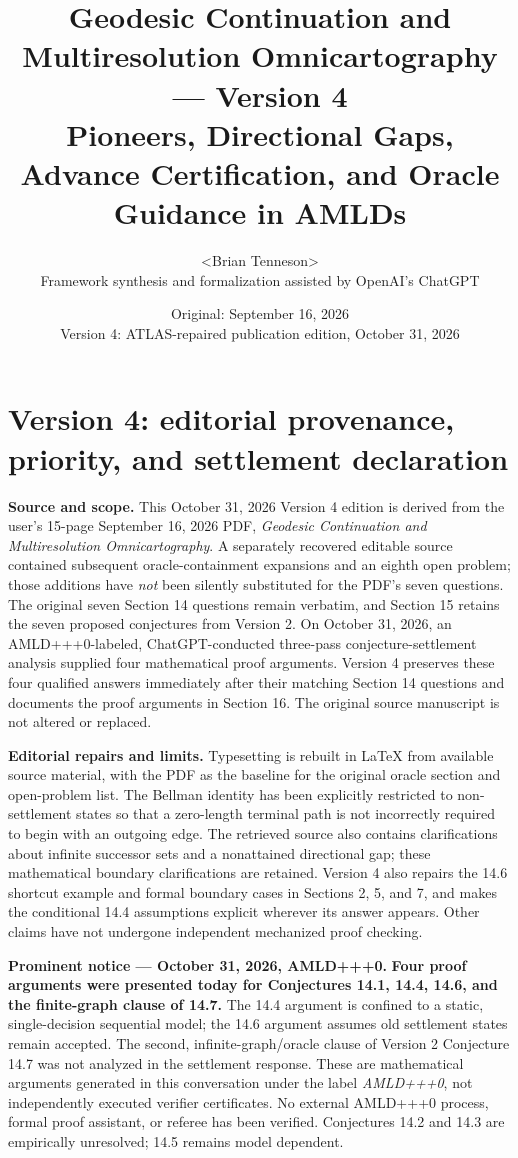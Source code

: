 \documentclass[11pt]{article}
\title{\textbf{Geodesic Continuation and Multiresolution Omnicartography --- Version 4}\\
\large Pioneers, Directional Gaps, Advance Certification, and Oracle Guidance in AMLDs}
\author{\textless{}Brian Tenneson\textgreater{}\\[4pt]{\small Framework synthesis and formalization assisted by OpenAI's ChatGPT}}
\date{Original: September 16, 2026\\Version 4: ATLAS-repaired publication edition, October 31, 2026}
\theoremstyle{definition}
\theoremstyle{remark}
\begin{document}
\maketitle

\section*{Version 4: editorial provenance, priority, and settlement declaration}
\noindent\textbf{Source and scope.} This October 31, 2026 Version 4 edition is derived from the user's 15-page September 16, 2026 PDF, \emph{Geodesic Continuation and Multiresolution Omnicartography}. A separately recovered editable source contained subsequent oracle-containment expansions and an eighth open problem; those additions have \emph{not} been silently substituted for the PDF's seven questions. The original seven Section 14 questions remain verbatim, and Section 15 retains the seven proposed conjectures from Version 2. On October 31, 2026, an AMLD+++0-labeled, ChatGPT-conducted three-pass conjecture-settlement analysis supplied four mathematical proof arguments. Version 4 preserves these four qualified answers immediately after their matching Section 14 questions and documents the proof arguments in Section 16. The original source manuscript is not altered or replaced.

\noindent\textbf{Editorial repairs and limits.} Typesetting is rebuilt in LaTeX from available source material, with the PDF as the baseline for the original oracle section and open-problem list. The Bellman identity has been explicitly restricted to non-settlement states so that a zero-length terminal path is not incorrectly required to begin with an outgoing edge. The retrieved source also contains clarifications about infinite successor sets and a nonattained directional gap; these mathematical boundary clarifications are retained. Version 4 also repairs the 14.6 shortcut example and formal boundary cases in Sections 2, 5, and 7, and makes the conditional 14.4 assumptions explicit wherever its answer appears. Other claims have not undergone independent mechanized proof checking.

\noindent\textbf{Prominent notice --- October 31, 2026, AMLD+++0.} \textbf{Four proof arguments were presented today for Conjectures 14.1, 14.4, 14.6, and the finite-graph clause of 14.7.} The 14.4 argument is confined to a static, single-decision sequential model; the 14.6 argument assumes old settlement states remain accepted. The second, infinite-graph/oracle clause of Version 2 Conjecture 14.7 was not analyzed in the settlement response. These are mathematical arguments generated in this conversation under the label \emph{AMLD+++0}, not independently executed verifier certificates. No external AMLD+++0 process, formal proof assistant, or referee has been verified. Conjectures 14.2 and 14.3 are empirically unresolved; 14.5 remains model dependent.
\end{document}
